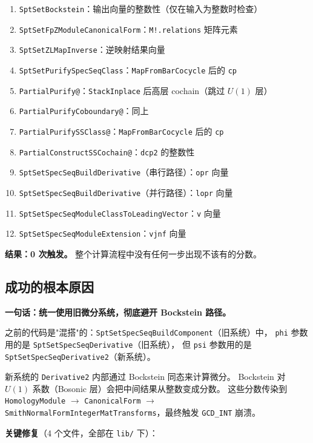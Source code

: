 \documentclass[a4paper,fontset=ubuntu,12pt]{ctexart}
\begin{document}
\begin{enumerate}
\item \texttt{SptSetBockstein}：输出向量的整数性（仅在输入为整数时检查）
\item \texttt{SptSetFpZModuleCanonicalForm}：\texttt{M!.relations} 矩阵元素
\item \texttt{SptSetZLMapInverse}：逆映射结果向量
\item \texttt{SptSetPurifySpecSeqClass}：\texttt{MapFromBarCocycle} 后的 \texttt{cp}
\item \texttt{PartialPurify@}：\texttt{StackInplace} 后高层 cochain（跳过 $U(1)$ 层）
\item \texttt{PartialPurifyCoboundary@}：同上
\item \texttt{PartialPurifySSClass@}：\texttt{MapFromBarCocycle} 后的 \texttt{cp}
\item \texttt{PartialConstructSSCochain@}：\texttt{dcp2} 的整数性
\item \texttt{SptSetSpecSeqBuildDerivative}（串行路径）：\texttt{opr} 向量
\item \texttt{SptSetSpecSeqBuildDerivative}（并行路径）：\texttt{lopr} 向量
\item \texttt{SptSetSpecSeqModuleClassToLeadingVector}：\texttt{v} 向量
\item \texttt{SptSetSpecSeqModuleExtension}：\texttt{vjnf} 向量
\end{enumerate}

\textbf{结果：0 次触发。} 整个计算流程中没有任何一步出现不该有的分数。

\subsection{成功的根本原因}
\label{sec:sg30-root-cause}

\textbf{一句话：统一使用旧微分系统，彻底避开 Bockstein 路径。}

之前的代码是"混搭"的：\texttt{SptSetSpecSeqBuildComponent}（旧系统）中，
\texttt{phi} 参数用的是 \texttt{SptSetSpecSeqDerivative}（旧系统），
但 \texttt{psi} 参数用的是 \texttt{SptSetSpecSeqDerivative2}（新系统）。

新系统的 \texttt{Derivative2} 内部通过 Bockstein 同态来计算微分。
Bockstein 对 $U(1)$ 系数（Bosonic 层）会把中间结果从整数变成分数。
这些分数传染到 \texttt{HomologyModule} $\to$ \texttt{CanonicalForm} $\to$
\texttt{SmithNormalFormIntegerMatTransforms}，最终触发 \texttt{GCD\_INT} 崩溃。

\textbf{关键修复}（4 个文件，全部在 \texttt{lib/} 下）：
\end{document}
